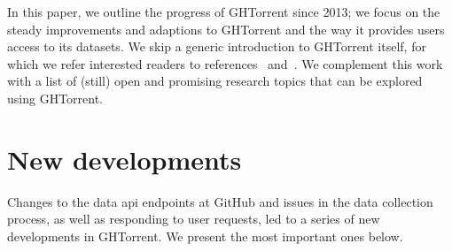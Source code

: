 \documentclass{sig-alternate}
\begin{document}
In this paper, we outline the progress of GHTorrent since 2013; we focus on the
steady improvements and adaptions to GHTorrent and the way it provides users
access to its datasets. We skip a generic introduction to GHTorrent itself, for
which we refer interested readers to references~\cite{GS12} and~\cite{Gousi13}.
We complement this work with a list of (still) open and promising research
topics that can be explored using GHTorrent.

\section{New developments}

Changes to the data {\sc api} endpoints at GitHub and issues in the data collection
process, as well as responding to user requests, led to a series of new
developments in GHTorrent. We present the most important ones below.
\end{document}
